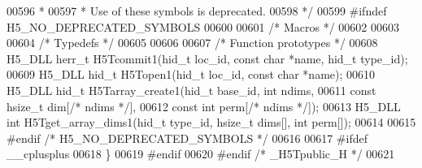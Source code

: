 \begin{DoxyCode}
00596 \textcolor{comment}{ *}
00597 \textcolor{comment}{ * Use of these symbols is deprecated.}
00598 \textcolor{comment}{ */}
00599 \textcolor{preprocessor}{#ifndef H5\_NO\_DEPRECATED\_SYMBOLS}
00600 
00601 \textcolor{comment}{/* Macros */}
00602 
00603 
00604 \textcolor{comment}{/* Typedefs */}
00605 
00606 
00607 \textcolor{comment}{/* Function prototypes */}
00608 H5\_DLL herr\_t H5Tcommit1(hid\_t loc\_id, \textcolor{keyword}{const} \textcolor{keywordtype}{char} *name, hid\_t type\_id);
00609 H5\_DLL hid\_t H5Topen1(hid\_t loc\_id, \textcolor{keyword}{const} \textcolor{keywordtype}{char} *name);
00610 H5\_DLL hid\_t H5Tarray\_create1(hid\_t base\_id, \textcolor{keywordtype}{int} ndims,
00611             \textcolor{keyword}{const} hsize\_t dim[\textcolor{comment}{/* ndims */}],
00612             \textcolor{keyword}{const} \textcolor{keywordtype}{int} perm[\textcolor{comment}{/* ndims */}]);
00613 H5\_DLL \textcolor{keywordtype}{int} H5Tget\_array\_dims1(hid\_t type\_id, hsize\_t dims[], \textcolor{keywordtype}{int} perm[]);
00614 
00615 \textcolor{preprocessor}{#endif }\textcolor{comment}{/* H5\_NO\_DEPRECATED\_SYMBOLS */}\textcolor{preprocessor}{}
00616 
00617 \textcolor{preprocessor}{#ifdef \_\_cplusplus}
00618 \}
00619 \textcolor{preprocessor}{#endif}
00620 \textcolor{preprocessor}{#endif }\textcolor{comment}{/* \_H5Tpublic\_H */}\textcolor{preprocessor}{}
00621 
\end{DoxyCode}
